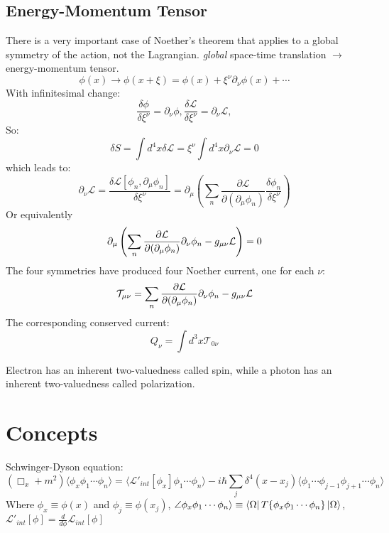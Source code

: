 \subsection{Energy-Momentum Tensor}
There is a very important case of Noether's theorem that applies to a global
symmetry of the action, not the Lagrangian.
\textit{global} space-time translation $\rightarrow$ energy-momentum tensor.  \\
\[ \phi(x) \rightarrow \phi(x+\xi) = \phi(x) + \xi^\nu\partial_\nu\phi(x) + \cdots \]
With infinitesimal change:
\[ \frac{\delta\phi}{\delta\xi^\nu} = \partial_\nu\phi, 
\frac{\delta\mathcal{L}}{\delta\xi^\nu} = \partial_\nu\mathcal{L}, 
\]
So:
\[ \delta S = \int d^4x\delta\mathcal{L} = \xi^\nu\int
d^4x\partial_\nu\mathcal{L} = 0 \]
which leads to:
\[ \partial_\nu\mathcal{L} =
\frac{\delta\mathcal{L}[\phi_n,\partial_\mu\phi_n]}{\delta\xi^\nu} = 
\partial_\mu\left(
\displaystyle\sum_n\frac{\partial\mathcal{L}}{\partial(\partial_\mu\phi_n)}\frac{\delta\phi_n}{\delta\xi^\nu}
\right)
    \]
Or equivalently
\[
\partial_\mu\left(
\displaystyle\sum_n\frac{\partial\mathcal{L}}{\partial(\partial_\mu\phi_n)}\partial_\nu\phi_n
- g_{\mu\nu}\mathcal{L}
\right) = 0
    \]
The four symmetries have produced four Noether current, one for each $\nu$:
\begin{equation}
    \mathcal{T}_{\mu\nu} = 
    \displaystyle\sum_n\frac{\partial\mathcal{L}}{\partial(\partial_\mu\phi_n)}\partial_\nu\phi_n
    - g_{\mu\nu}\mathcal{L}
\end{equation}
The corresponding conserved current:
\[
    Q_\nu = \int d^3x\mathcal{T}_{0\nu} \]


Electron has an inherent two-valuedness called spin, while a photon has
an inherent two-valuedness called polarization.


\section{Concepts}

Schwinger-Dyson equation:
\begin{equation}
    \label{eqn:Schwinger-Dyson}
    (\Box_x + m^2)\langle \phi_x\phi_1\cdots\phi_n \rangle = 
    \langle \mathcal{L}'_{int}[\phi_x]\phi_1\cdots\phi_n \rangle -
    i\hbar\displaystyle \sum_j \delta^4(x-x_j)\langle \phi_1\cdots\phi_{j-1}\phi_{j+1}\cdots\phi_n \rangle
\end{equation}
Where $\phi_x \equiv \phi(x)$ and $\phi_j \equiv \phi(x_j)$, $\angle \phi_x\phi_1\cdots\phi_n \rangle \equiv \bra{\Omega}T\{\phi_x\phi_1\cdots\phi_n\}\ket{\Omega}$, $\mathcal{L}'_{int}[\phi] = \frac{d}{d\phi}\mathcal{L}_{int}[\phi]$

